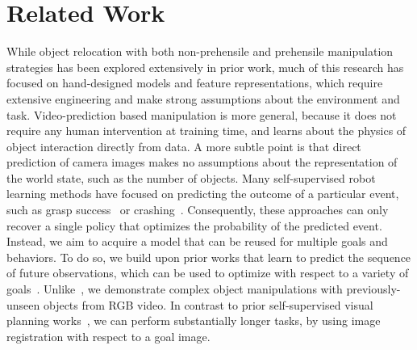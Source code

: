 \vspace{-0.1cm}
\section{Related Work}
\vspace{-0.1cm}

While object relocation with both non-prehensile \cite{hermans2013learning,salganicoff1993vision} and prehensile \cite{goldfeder2009data} manipulation strategies has been explored extensively in prior work, much of this research has focused on hand-designed models and feature representations, which require extensive engineering and make strong assumptions about the environment and task.
Video-prediction based manipulation is more general, because it does not require any human intervention at training time, and learns about the physics of object interaction directly from data. A more subtle point is that direct prediction of camera images makes no assumptions about the representation of the world state, such as the number of objects.
Many self-supervised robot learning methods have focused on predicting the outcome of a particular event, such as grasp success~\cite{lerrel,google_handeye,princeton_pushgrasp} or crashing~\cite{crashing,greg_kahn_uncertainty}. Consequently, these approaches can only recover a single policy that optimizes the probability of the predicted event. Instead, we aim to acquire a model that can be reused for multiple goals and behaviors. To do so, we build upon prior works that learn to predict the sequence of future observations, which can be used to optimize with respect to a variety of goals~\cite{foresight,sna,se3_control}. Unlike~\cite{se3_control}, we demonstrate complex object manipulations with previously-unseen objects from RGB video. In contrast to prior self-supervised visual planning works~\cite{foresight,sna}, we can perform substantially longer tasks, by using image registration with respect to a goal image.

